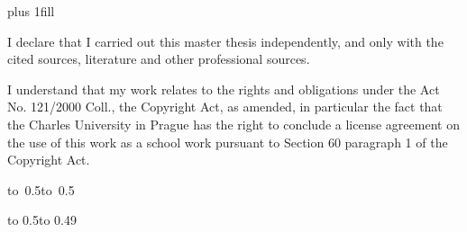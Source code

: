 \documentclass[12pt,a4paper]{report}
\begin{document}
\newpage


\vglue 0pt plus 1fill

\noindent
I declare that I carried out this master thesis independently, and only with the cited
sources, literature and other professional sources.

\medskip\noindent
I understand that my work relates to the rights and obligations under the Act No.
121/2000 Coll., the Copyright Act, as amended, in particular the fact that the Charles
University in Prague has the right to conclude a license agreement on the use of this
work as a school work pursuant to Section 60 paragraph 1 of the Copyright Act.

\vspace{10mm}

\hbox{\hbox to 0.5\hbox to 0.5}

\vspace{20mm}
\newpage



\vbox to 0.5\nobreak\vbox to 0.49
\end{document}
